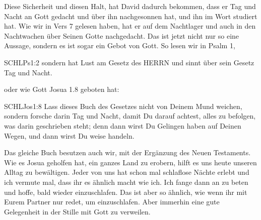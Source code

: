 \documentclass[14pt]{../../inc/mybib}
\begin{document}
    \begin{block}
        Diese Sicherheit und diesen Halt, hat David dadurch bekommen, dass er Tag und Nacht an Gott gedacht und über ihn nachgesonnen hat, und ihn im Wort studiert hat. Wie wir in Vers 7 gelesen haben, hat er auf dem Nachtlager und auch in den Nachtwachen über Seinen Gotte nachgedacht. Das ist jetzt nicht nur so eine Aussage, sondern es ist sogar ein Gebot von Gott. So lesen wir in Psalm 1,
        \begin{bibelbox}{SCHL}{Ps}{1:2}
            sondern hat Lust am Gesetz des HERRN und sinnt über sein Gesetz Tag und Nacht.
        \end{bibelbox}
        oder wie Gott Josua 1.8 geboten hat:
        \begin{bibelbox}{SCHL}{Jos}{1:8}
            Lass dieses Buch des Gesetzes nicht von Deinem Mund weichen, sondern forsche darin Tag und Nacht, damit Du darauf achtest, alles zu befolgen, was darin geschrieben steht; denn dann wirst Du Gelingen haben auf Deinen Wegen, und dann wirst Du weise handeln.
        \end{bibelbox}
        Das gleiche Buch besutzen auch wir, mit der Ergänzung des Neuen Testaments. Wie es Josua geholfen hat, ein ganzes Land zu erobern, hilft es uns heute unseren Alltag zu bewältigen.
        Jeder von uns hat schon mal schlaflose Nächte erlebt und ich vermute mal, dass ihr es ähnlich macht wie ich. Ich fange dann an zu beten und hoffe, bald wieder einzuschlafen. Das ist aber so ähnlich, wie wenn ihr mit Eurem Partner nur redet, um einzuschlafen. Aber immerhin eine gute Gelegenheit in der Stille mit Gott zu verweilen.
    \end{block}   
\end{document}
